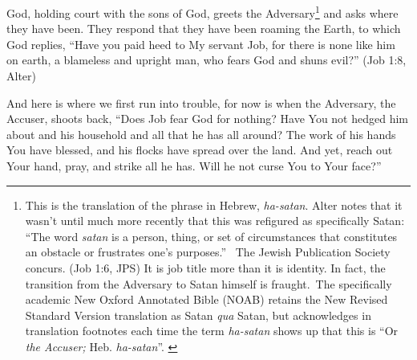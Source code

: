 God, holding court with the sons of God, greets the Adversary\footnote{This is the translation of the phrase in Hebrew, \emph{ha-satan}. Alter notes that it wasn't until much more recently that this was refigured as specifically Satan: ``The word \emph{satan} is a person, thing, or set of circumstances that constitutes an obstacle or frustrates one's purposes.''\footnotemark~\parencite[466]{alter} The Jewish Publication Society concurs. (Job 1:6, JPS) It is job title more than it is identity. In fact, the transition from the Adversary to Satan himself is fraught.\footnotemark~The specifically academic New Oxford Annotated Bible (NOAB) retains the New Revised Standard Version translation as Satan \emph{qua} Satan, but acknowledges in translation footnotes each time the term \emph{ha-satan} shows up that this is ``Or \emph{the Accuser;} Heb. \emph{ha-satan}''. \parencite[736]{noab}\addtocounter{footnote}{-1}} and asks where they have been. They respond that they have been roaming the Earth, to which God replies, ``Have you paid heed to My servant Job, for there is none like him on earth, a blameless and upright man, who fears God and shuns evil?'' (Job 1:8, Alter)

And here is where we first run into trouble, for now is when the Adversary, the Accuser, shoots back, ``Does Job fear God for nothing? Have You not hedged him about and his household and all that he has all around? The work of his hands You have blessed, and his flocks have spread over the land. And yet, reach out Your hand, pray, and strike all he has. Will he not curse You to Your face?''

